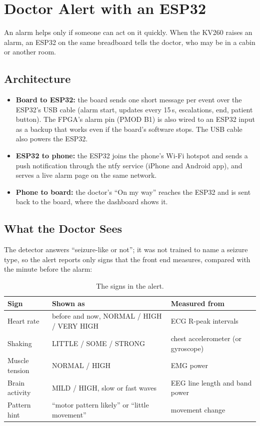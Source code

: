 \chapter{Doctor Alert with an ESP32}\label{ch:alert}

An alarm helps only if someone can act on it quickly. When the KV260 raises an alarm, an ESP32 on the same breadboard
tells the doctor, who may be in a cabin or another room.

\section{Architecture}

\begin{itemize}
\item \textbf{Board to ESP32:} the board sends one short message per event over the ESP32's USB cable (alarm start,
  updates every 15\,s, escalations, end, patient button). The FPGA's alarm pin (PMOD B1) is also wired to an ESP32
  input as a backup that works even if the board's software stops. The USB cable also powers the ESP32.
\item \textbf{ESP32 to phone:} the ESP32 joins the phone's Wi-Fi hotspot and sends a push notification through the
  ntfy service (iPhone and Android app), and serves a live alarm page on the same network.
\item \textbf{Phone to board:} the doctor's ``On my way'' reaches the ESP32 and is sent back to the board, where the
  dashboard shows it.
\end{itemize}

\section{What the Doctor Sees}

The detector answers ``seizure-like or not''; it was not trained to name a seizure type, so the alert reports only
signs that the front end measures, compared with the minute before the alarm:

\begin{table}[H]
\centering\small
\caption{The signs in the alert.}\label{tab:signs}
\begin{tabularx}{\textwidth}{@{}lLP{50mm}@{}}
\toprule
\textbf{Sign} & \textbf{Shown as} & \textbf{Measured from}\\
\midrule
Heart rate & before and now, NORMAL / HIGH / VERY HIGH & ECG R-peak intervals\\
Shaking & LITTLE / SOME / STRONG & chest accelerometer (or gyroscope)\\
Muscle tension & NORMAL / HIGH & EMG power\\
Brain activity & MILD / HIGH, slow or fast waves & EEG line length and band power\\
Pattern hint & ``motor pattern likely'' or ``little movement'' & movement change\\
\bottomrule
\end{tabularx}
\end{table}

